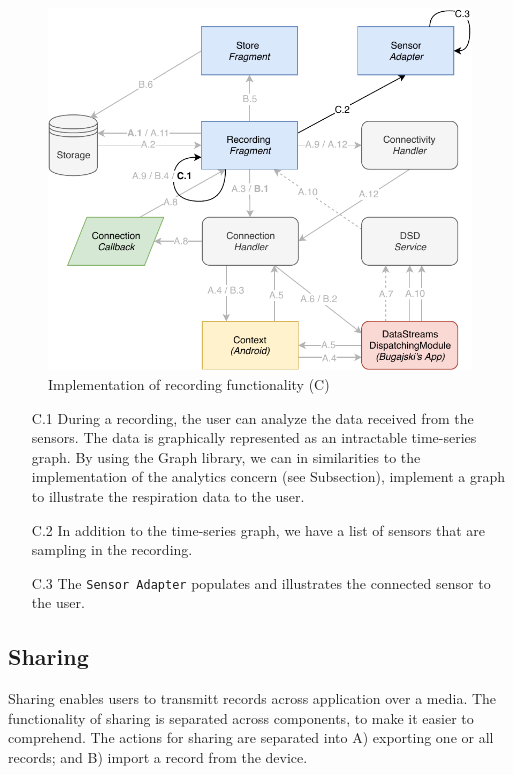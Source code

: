 \begin{figure}
    \centering
    \includegraphics[scale=0.7]{images/Recording_ImpC.pdf}
    \caption{Implementation of recording functionality (C)}
    \label{fig:impl_recordingC}
\end{figure}

\begin{itemize}
    \item[C.1] During a recording, the user can analyze the data received from the sensors. The data is graphically represented as an intractable time-series graph. By using the Graph library, we can in similarities to the implementation of the analytics concern (see Subsection), implement a graph to illustrate the respiration data to the user.
    \item[C.2] In addition to the time-series graph, we have a list of sensors that are sampling in the recording. 
    \item[C.3] The \verb|Sensor Adapter| populates and illustrates the connected sensor to the user.
\end{itemize}


\subsection{Sharing}

Sharing enables users to transmitt records across application over a media. The functionality of sharing is separated across components, to make it easier to comprehend. The actions for sharing are separated into A) exporting one or all records; and B) import a record from the device. 

